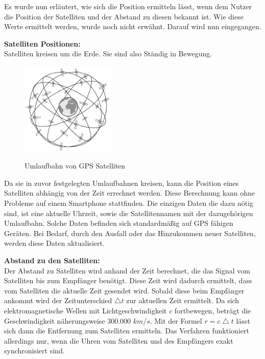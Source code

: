 Es wurde nun erläutert, wie sich die Position ermitteln lässt, wenn dem Nutzer die Position der Satelliten und der Abstand zu diesen bekannt ist. Wie diese Werte ermittelt werden, wurde noch nicht erwähnt. Darauf wird nun eingegangen.

\textbf{Satelliten Positionen:}\\
Satelliten kreisen um die Erde. Sie sind also Ständig in Bewegung. 

\begin{figure}[h]
\centering
\includegraphics[width=0.4\textwidth]{ref/images/GPS_Umlaufbahn.PNG}
\caption[Umlaufbahn von GPS Satelliten]{Umlaufbahn von GPS Satelliten}
\label{fig:Umlaufbahn Satelliten}
\cite[S. 164]{Kuepper2005}
\end{figure}

Da sie in zuvor festgelegten Umlaufbahnen kreisen, kann die Position eines Satelliten abhängig von der Zeit errechnet werden. 
Diese Berechnung kann ohne Probleme auf einem Smartphone stattfinden. Die einzigen Daten die dazu nötig sind, ist eine aktuelle Uhrzeit, sowie die Satellitennamen mit der dazugehörigen Umlaufbahn. Solche Daten befinden sich standardmäßig auf GPS fähigen Geräten. Bei Bedarf, durch den Ausfall oder das Hinzukommen neuer Satelliten, werden diese Daten aktualisiert.
\cite[S. 189]{Schiller2004}


\textbf{Abstand zu den Satelliten:}\\
Der Abstand zu Satelliten wird anhand der Zeit berechnet, die das Signal vom Satelliten bis zum Empfänger benötigt. Diese Zeit wird dadurch ermittelt, dass vom Satelliten die aktuelle Zeit gesendet wird. Sobald diese beim Empfänger ankommt wird der Zeitunterschied $ \bigtriangleup t $ zur aktuellen Zeit ermittelt. Da sich elektromagnetische Wellen mit Lichtgeschwindigkeit $ c $ fortbewegen, beträgt die Geschwindigkeit näherungsweise 300.000 $km/s$. Mit der Formel $ r = c \bigtriangleup t$ lässt sich dann die Entfernung zum Satelliten ermitteln. Das Verfahren funktioniert allerdings nur, wenn die Uhren vom Satelliten und des Empfängers exakt synchronisiert sind. 
\cite[S. 189]{Schiller2004}

